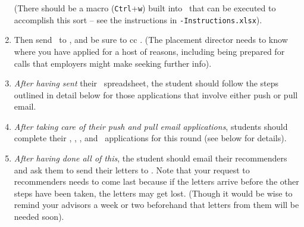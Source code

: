 \documentclass{econtex}
\newcommand\redout{\bgroup\markoverwith
{\textcolor{red}{\rule[.5ex]{2pt}{1pt}}}\ULon}
\begin{document}
\begin{enumerate}
  (There should be a macro (\texttt{Ctrl}+\texttt{w}) built into \EM~that can be
  executed to accomplish this sort -- see the instructions in
  \EM\texttt{-Instructions.xlsx}).


\item Then send \EM~to \JMStaffEmail, and be sure to cc \JMPOEmail.
  (The placement director needs to know where you have applied for a
  host of reasons, including being prepared for calls that employers
  might make seeking further info).


\item {\it After having sent} their \EMW~spreadsheet, the student
  should follow the steps outlined in detail below for those
  applications that involve either push or pull email.

\item {\it After taking care of their push and pull email applications}, students should complete their \EJM, \AJO, \AEA, and \Interfolio~applications for this round (see below for details).

\item {\it After having done all of this}, the student should email
  their recommenders and ask them to send their letters to
  \JMStaffEmail.  Note that your request to recommenders needs to come
  last because if the letters arrive before the other steps have been
  taken, the letters may get lost.  (Though it would be wise to remind
  your advisors a week or two beforehand that letters from them will
  be needed soon).

\end{enumerate}
\end{document}
